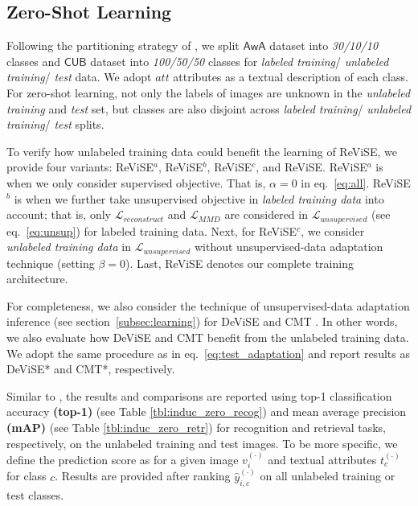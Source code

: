 {\subsection{Zero-Shot Learning}
\label{subsec:zero_learn}
{
	Following the partitioning strategy of \cite{akata2015evaluation,xian2016latent}, we split $\mathsf{AwA}$ dataset into {\em 30/10/10} classes and $\mathsf{CUB}$ dataset into {\em 100/50/50} classes for {\em labeled training}/ {\em unlabeled training}/ {\em test} data. We adopt $\mathit{att}$ attributes as a textual description of each class. For zero-shot learning, not only the labels of images are unknown in the {\em unlabeled training} and {\em test} set, but classes are also disjoint across {\em labeled training}/ {\em unlabeled training}/ {\em test} splits. 


	To verify how unlabeled training data could benefit the learning of ReViSE, we provide four variants: ReViSE$^a$, ReViSE$^b$, ReViSE$^c$, and ReViSE. ReViSE$^a$ is when we only consider supervised objective. That is, $\alpha = 0$ in eq.~\eqref{eq:all}. ReViSE$^b$ is when we further take unsupervised objective in {\em labeled training data} into account; that is, only $\mathcal{L}_{reconstruct}$ and $\mathcal{L}_{MMD}$ are considered in $\mathcal{L}_{unsupervised}$ (see eq.~\eqref{eq:unsup}) for labeled training data. Next, for ReViSE$^c$, we consider {\em unlabeled training data} in $\mathcal{L}_{unsupervised}$ without unsupervised-data adaptation technique (setting $\beta = 0$). Last, ReViSE denotes our complete training architecture. 

	For completeness, we also consider the technique of unsupervised-data adaptation inference (see section~\ref{subsec:learning}) for DeViSE \cite{frome2013devise} and CMT \cite{socher2013zero}. In other words, we also evaluate how DeViSE and CMT benefit from the unlabeled training data. We adopt the same procedure as in eq.~\eqref{eq:test_adaptation} and report results as DeViSE* and CMT*, respectively.


	Similar to \cite{zhang2015zero,zhang2016zero1,zhang2016zero2}, the results and comparisons are reported using top-1 classification accuracy {\bf (top-1)} (see Table \ref{tbl:induc_zero_recog}) and mean average precision {\bf (mAP)} (see Table \ref{tbl:induc_zero_retr}) for recognition and retrieval tasks, respectively, on the unlabeled training and test images. To be more specific, we define the prediction score as  for a given image $v_i^{(\cdot)}$ and textual attributes $t_{c}^{(\cdot)}$ for class $c$. Results are provided after ranking $\hat{y}_{i,c}^{(\cdot)}$ on all unlabeled training or test classes. 

}}
